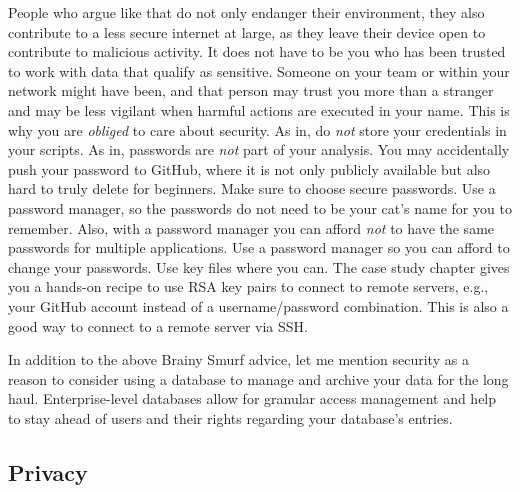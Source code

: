 \documentclass[
  12pt,
  letterpaper,
]{krantz}
\begin{document}
People who argue like that do not only endanger their environment, they
also contribute to a less secure internet at large, as they leave their
device open to contribute to malicious activity. It does not have to be
you who has been trusted to work with data that qualify as sensitive.
Someone on your team or within your network might have been, and that
person may trust you more than a stranger and may be less vigilant when
harmful actions are executed in your name. This is why you are
\emph{obliged} to care about security. As in, do \emph{not} store your
credentials in your scripts. As in, passwords are \emph{not} part of
your analysis. You may accidentally push your password to GitHub, where
it is not only publicly available but also hard to truly delete for
beginners. Make sure to choose secure passwords. Use a password manager,
so the passwords do not need to be your cat's name for you to remember.
Also, with a password manager you can afford \emph{not} to have the same
passwords for multiple applications. Use a password manager so you can
afford to change your passwords. Use key files where you can. The case
study chapter gives you a hands-on recipe to use RSA key pairs to
connect to remote servers, e.g., your GitHub account instead of a
username/password combination. This is also a good way to connect to a
remote server via SSH.

In addition to the above Brainy Smurf advice, let me mention
security as a reason to consider using a
database to manage and archive your data for the long
haul. Enterprise-level databases allow for granular
access management and help to stay ahead of users and their rights
regarding your database's entries.

\hypertarget{privacy}{%
\subsection{\texorpdfstring{Privacy}{Privacy}}\label{privacy}}
\end{document}
